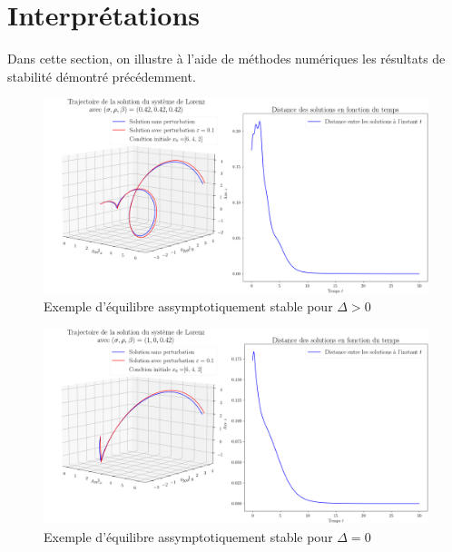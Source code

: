 \documentclass{article}
\newtheorem[M , nocut]{prop}{Proposition}[section]
\newtheorem[M , nocut]{definition}{Définition}
\newtheorem[M , nocut]{lemme}{Lemme}
\newtheorem[L , nocut]{thm}{Théoreme}
\newtheorem[M , nocut]{cor}{Corollaire}
\begin{document}
\newpage
\section{Interprétations}
Dans cette section, on illustre à l'aide de méthodes numériques les résultats de stabilité démontré précédemment.

\begin{figure}[!ht]
    \label{fig:EqAS-Dsup0}
    \centering
    \includegraphics[width = \textwidth]{EqAS-Dsup0}
    \caption{Exemple d'équilibre assymptotiquement stable pour $\Delta>0$}
\end{figure}

\begin{figure}[!ht]
    \label{fig:EqAS-Deg0}
    \centering
    \includegraphics[width = \textwidth]{EqAS-Deg0}
    \caption{Exemple d'équilibre assymptotiquement stable pour $\Delta=0$}
\end{figure}
\end{document}
